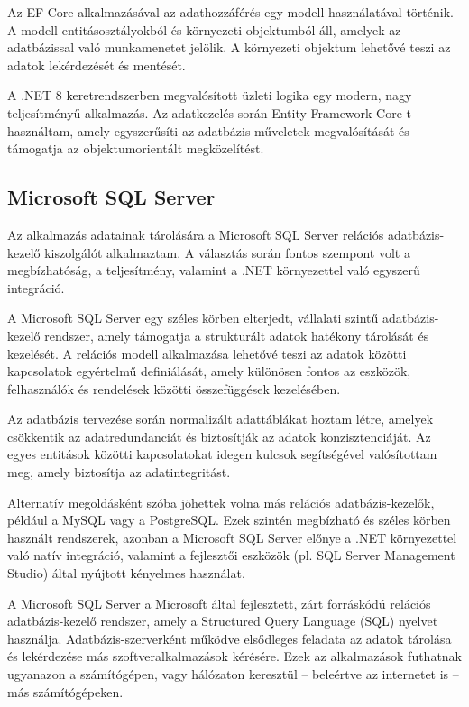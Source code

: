 \documentclass[
]{thesis-ekf}
\theoremstyle{definition}
\theoremstyle{remark}
\begin{document}
Az EF Core alkalmazásával az adathozzáférés egy modell használatával történik. A modell entitásosztályokból és környezeti objektumból áll, amelyek az adatbázissal való munkamenetet jelölik. A környezeti objektum lehetővé teszi az adatok lekérdezését és mentését.\cite{EntityFrameworkCore}

A .NET 8 keretrendszerben megvalósított üzleti logika egy modern, nagy teljesítményű alkalmazás. Az adatkezelés során Entity Framework Core-t használtam, amely egyszerűsíti az adatbázis-műveletek megvalósítását és támogatja az objektumorientált megközelítést.

\subsection{Microsoft SQL Server}
Az alkalmazás adatainak tárolására a Microsoft SQL Server relációs adatbázis-kezelő kiszolgálót alkalmaztam. A választás során fontos szempont volt a megbízhatóság, a teljesítmény, valamint a .NET környezettel való egyszerű integráció.

A Microsoft SQL Server egy széles körben elterjedt, vállalati szintű adatbázis-kezelő rendszer, amely támogatja a strukturált adatok hatékony tárolását és kezelését. A relációs modell alkalmazása lehetővé teszi az adatok közötti kapcsolatok egyértelmű definiálását, amely különösen fontos az eszközök, felhasználók és rendelések közötti összefüggések kezelésében.

Az adatbázis tervezése során normalizált adattáblákat hoztam létre, amelyek csökkentik az adatredundanciát és biztosítják az adatok konzisztenciáját. Az egyes entitások közötti kapcsolatokat idegen kulcsok segítségével valósítottam meg, amely biztosítja az adatintegritást.

Alternatív megoldásként szóba jöhettek volna más relációs adatbázis-kezelők, például a MySQL vagy a PostgreSQL. Ezek szintén megbízható és széles körben használt rendszerek, azonban a Microsoft SQL Server előnye a .NET környezettel való natív integráció, valamint a fejlesztői eszközök (pl. SQL Server Management Studio) által nyújtott kényelmes használat.

A Microsoft SQL Server a Microsoft által fejlesztett, zárt forráskódú relációs adatbázis-kezelő rendszer, amely a Structured Query Language (SQL) nyelvet használja. Adatbázis-szerverként működve elsődleges feladata az adatok tárolása és lekérdezése más szoftveralkalmazások kérésére. Ezek az alkalmazások futhatnak ugyanazon a számítógépen, vagy hálózaton keresztül -- beleértve az internetet is -- más számítógépeken.\cite{SQLServer}
\end{document}
